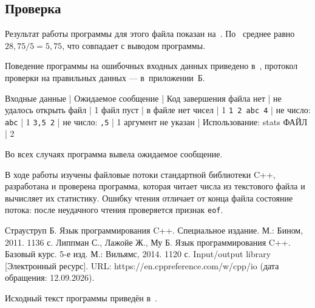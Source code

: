 \documentclass[a4paper,14pt]{extarticle}
\begin{document}
\subsection{Проверка}

Результат работы программы для этого файла показан на~.
По~ среднее равно $28{,}75 / 5 = 5{,}75$, что совпадает
с выводом программы.


Поведение программы на ошибочных входных данных приведено
в~, протокол проверки на правильных данных —
в~приложении~Б.

Входные данные          | Ожидаемое сообщение           | Код завершения
файла нет               | не удалось открыть файл       | 1
файл пуст               | в файле нет чисел             | 1
\texttt{1 2 abc 4}      | не число: \texttt{abc}        | 1
\texttt{3,5 2}          | не число: \texttt{,5}         | 1
аргумент не указан      | Использование: stats ФАЙЛ     | 2

Во всех случаях программа вывела ожидаемое сообщение.

\suaiconclusion

В ходе работы изучены файловые потоки стандартной библиотеки C++,
разработана и проверена программа, которая читает числа из текстового
файла и вычисляет их статистику. Ошибку чтения отличает от конца файла
состояние потока: после неудачного чтения проверяется признак
\texttt{eof}.

\suaisources
Страуструп Б. Язык программирования C++. Специальное издание. М.: Бином, 2011. 1136 с.
Липпман С., Лажойе Ж., Му Б. Язык программирования C++. Базовый курс. 5-е изд. М.: Вильямс, 2014. 1120 с.
Input/output library [Электронный ресурс]. URL: https://en.cppreference.com/w/cpp/io (дата обращения: 12.09.2026).


Исходный текст программы приведён в~.

\end{document}
